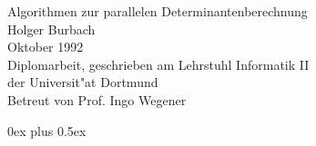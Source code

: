 % 
%
\begin{titlepage}
    \begin{center}
        \vspace*{6cm}
        \LARGE Algorithmen zur parallelen Determinantenberechnung 
                                                             \\[1.5cm]
        \Large    Holger Burbach \\[1cm]
        Oktober 1992 \\[4cm]
        Diplomarbeit, geschrieben am Lehrstuhl Informatik II \\
        der Universit"at Dortmund \\[1cm]
        Betreut von Prof. Ingo Wegener
    \end{center}
\end{titlepage}
\setcounter{page}{2}
%
{  \parskip0ex plus 0.5ex
   \tableofcontents
}

